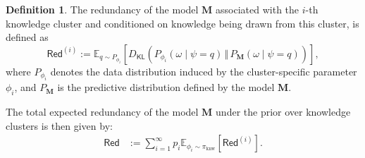 \documentclass[11pt]{article}
\theoremstyle{plain}
\theoremstyle{definition}
\newtheorem{definition}[theorem]{Definition}
\newcommand{\DKL}{D_{\mathsf{KL}}}
\newcommand{\Model}{\boldsymbol{M}}
\newcommand{\knwModel}{\phi_{\text{knw}}}
\newcommand{\basemeasure}{\pi_{\text{knw}}}
\newcommand{\question}{\psi}
\newcommand{\answer}{\omega}
\newcommand{\testerror}{\mathsf{Red}}
\newcommand{\ferror}{\mathsf{Red}}
\newcommand{\jian}[1]{{\it \color{red}{Jian: #1}}}
\begin{document}
\begin{definition}
The redundancy of the model \( \Model \) associated with the \( i \)-th knowledge cluster and conditioned on knowledge being drawn from this cluster, is defined as
\[
\ferror^{(i)} := \mathbb{E}_{q \sim P_{\phi_i}} \left[ \DKL\left( P_{\phi_i}(\answer \mid \question=q) \,\Vert\, P_{\Model}(\answer \mid \question=q) \right) \right],
\]
where \( P_{\phi_i} \) denotes the data distribution induced by the cluster-specific parameter \( \phi_i \), and \( P_{\Model} \) is the predictive distribution defined by the model \( \Model \).



The total expected redundancy of the model \( \Model \) under the prior over knowledge clusters is then given by:
\begin{align*}
\testerror 
&:= \sum_{i=1}^{\infty} p_i \mathbb{E}_{\phi_i \sim \basemeasure}\left[\ferror^{(i)}\right].
\end{align*}













\end{definition}
\end{document}
